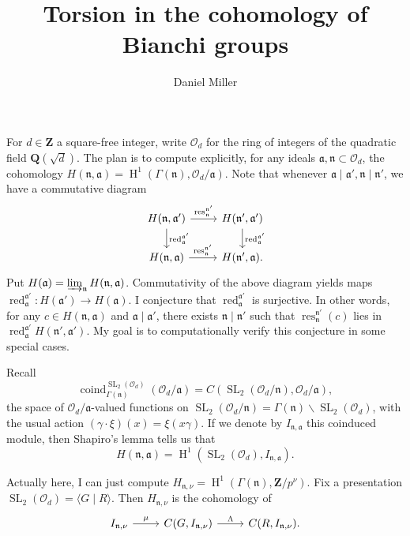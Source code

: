 \documentclass{article}
\title{Torsion in the cohomology of Bianchi groups}
\author{Daniel Miller}
\DeclareMathOperator{\coind}{coind}
\DeclareMathOperator{\h}{H}
\DeclareMathOperator{\red}{red}
\DeclareMathOperator{\res}{res}
\DeclareMathOperator{\SL}{SL}
\newcommand{\bQ}{\mathbf{Q}}
\newcommand{\bZ}{\mathbf{Z}}
\newcommand{\cO}{\mathcal{O}}
\newcommand{\fa}{\mathfrak{a}}
\newcommand{\fn}{\mathfrak{n}}
\begin{document}
\maketitle





For $d\in\bZ$ a square-free integer, write $\cO_d$ for the ring of integers of 
the quadratic field $\bQ(\sqrt d)$. The plan is to compute explicitly, for any 
ideals $\fa,\fn\subset \cO_d$, the cohomology 
$H(\fn,\fa)=\h^1(\Gamma(\fn),\cO_d/\fa)$. Note that whenever 
$\fa\mid \fa',\fn\mid\fn'$, we have a commutative diagram
\[
\begin{tikzcd}
	H(\fn,\fa') \ar[r, "\res_\fn^{\fn'}"] \ar[d, "\red_\fa^{\fa'}"]
		& H(\fn',\fa') \ar[d, "\red_\fa^{\fa'}"] \\
	H(\fn,\fa) \ar[r, "\res_\fn^{\fn'}"]
		& H(\fn',\fa) .
\end{tikzcd}
\]
Put $H(\fa)=\varinjlim_\fn H(\fn,\fa)$. Commutativity of the above diagram 
yields maps $\red_\fa^{\fa'}\colon H(\fa')\to H(\fa)$. I conjecture that 
$\red_\fa^{\fa'}$ is surjective. In other words, for any 
$c\in H(\fn,\fa)$ and $\fa\mid\fa'$, there exists $\fn\mid\fn'$ such that 
$\res_\fn^{\fn'}(c)$ lies in $\red_\fa^{\fa'}H(\fn',\fa')$. My goal is to 
computationally verify this conjecture in some special cases. 

Recall 
\[
	\coind_{\Gamma(\fn)}^{\SL_2(\cO_d)}(\cO_d/\fa) = C(\SL_2(\cO_d/\fn),\cO_d/\fa) ,
\]
the space of $\cO_d/\fa$-valued functions on 
$\SL_2(\cO_d/\fn) = \Gamma(\fn)\backslash \SL_2(\cO_d)$, with the usual action 
$(\gamma\cdot\xi)(x) = \xi(x\gamma)$. If we denote by $I_{\fn,\fa}$ this 
coinduced module, then Shapiro's lemma tells us that 
\[
	H(\fn,\fa) = \h^1\left(\SL_2(\cO_d),I_{\fn,\fa}\right) .
\]

Actually here, I can just compute $H_{\fn,\nu}=\h^1(\Gamma(\fn),\bZ/p^\nu)$. 
Fix a presentation $\SL_2(\cO_d)=\langle G\mid R\rangle$. Then $H_{\fn,\nu}$ is 
the cohomology of 
\[
\begin{tikzcd}
	I_{\fn,\nu} \ar[r, "\mu"]
		& C(G,I_{\fn,\nu}) \ar[r, "\Lambda"]
		& C(R,I_{\fn,\nu}) .
\end{tikzcd}
\] 
\end{document}
